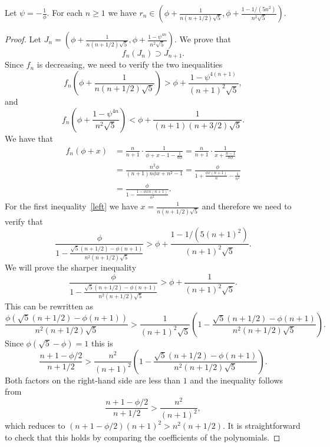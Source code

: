 \documentclass[10pt,a4paper]{amsart}
\begin{document}
\begin{lemma}\label{lem:estimate}
Let $\psi=-\frac {1}{\phi}$.
For each $n\geq 1$ we have $r_n\in \left(\phi+\frac{1}{n(n+1/2)\sqrt 5},\phi+\frac{1-1/{(5n^2)}}{n^2\sqrt 5}\right)$.
\end{lemma}

\begin{proof}
    Let $J_n=\left(\phi+\frac{1}{n(n+1/2)\sqrt 5},\phi+\frac{1-\psi^{4n}}{n^2\sqrt 5}\right)$. We prove that \[f_n(J_n)\supset J_{n+1}.\] Since $f_n$ is decreasing, we need to verify the two inequalities
    \begin{equation}\label{left}
    f_n\left(\phi+\frac{1}{n(n+1/2)\sqrt 5}\right)>\phi+\frac{1-\psi^{4(n+1)}}{(n+1)^2\sqrt 5},        
    \end{equation}
    and
    \begin{equation}\label{right}
    f_n\left(\phi+\frac{1-\psi^{4n}}{n^2\sqrt 5}\right)<\phi+\frac{1}{(n+1)(n+3/2)\sqrt 5}.
    \end{equation}
    We have that 
\begin{align*}
f_n(\phi + x) &= \frac{n}{n+1} \cdot \frac{1}{\phi + x - 1 - \frac{1}{n\phi}} 
= \frac{n}{n+1} \cdot \frac{1}{x + \frac{n-1}{n\phi}} \\
&= \frac{n^2\phi}{(n+1) n \phi x + n^2 - 1} 
= \frac{\phi}{1 + \frac{\phi x (n+1)}{n} - \frac{1}{n^2}}\\
&=\frac{\phi}{1 - \frac{1-\phi x n(n+1)}{n^2}}.
\end{align*}
    For the first inequality~\ref{left} we have $x=\frac{1}{n(n+1/2)\sqrt 5}$ and therefore we need to verify that
    \[
    \frac{\phi}{1-\frac {\sqrt 5(n+1/2) -\phi(n+1)}{n^2(n+1/2)\sqrt 5}}>\phi+\frac{1-1/(5(n+1)^2)}{(n+1)^2\sqrt 5}.
    \]
    We will prove the sharper inequality
    \[
    \frac{\phi}{1-\frac {\sqrt 5(n+1/2) -\phi(n+1)}{n^2(n+1/2)\sqrt 5}}>\phi+\frac{1}{(n+1)^2\sqrt 5}.
    \]
    This can be rewritten as
    \[
    \frac {\phi(\sqrt 5(n+1/2) -\phi(n+1))}{n^2(n+1/2)\sqrt 5}>\frac{1}{(n+1)^2\sqrt 5}\left(1-\frac {\sqrt 5(n+1/2) -\phi(n+1)}{n^2(n+1/2)\sqrt 5}\right).
    \] 
    Since $\phi(\sqrt 5 -\phi)=1$ this is
    \[
    \frac{n+1-\phi/2}{n+1/2}>\frac{n^2}{(n+1)^2}\left(1-\frac {\sqrt 5(n+1/2) -\phi(n+1)}{n^2(n+1/2)\sqrt 5}\right).
    \]
    Both factors on the right-hand side are less than $1$ and the inequality follows from
    \[
    \frac{n+1-\phi/2}{n+1/2}>\frac{n^2}{(n+1)^2},
    \]
    which reduces to $(n+1-\phi/2)(n+1)^2>n^2(n+1/2)$. It is straightforward to check that this holds
    by comparing the coefficients of the polynomials.
    

\end{proof}
\end{document}
